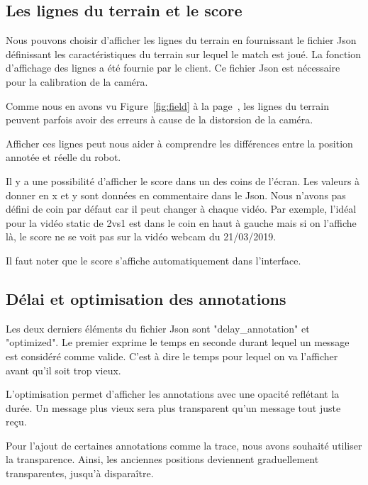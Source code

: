 \subsection{Les lignes du terrain et le score}

Nous pouvons choisir d'afficher les lignes du terrain en
fournissant le fichier Json définissant les caractéristiques du
terrain sur lequel le match est joué. La fonction d'affichage des
lignes a été fournie par le client.
Ce fichier Json est nécessaire pour la calibration de la caméra.
\bigskip

Comme nous en avons vu Figure~\ref{fig:field} à la
page~\pageref{fig:field}, les lignes du terrain peuvent parfois
avoir des erreurs à cause de la distorsion de la caméra.

Afficher ces lignes peut nous aider à comprendre les différences
entre la position annotée et réelle du robot.
\bigskip

Il y a une possibilité d'afficher le score dans un des coins de
l'écran. Les valeurs à donner en x et y sont données en
commentaire dans le Json. Nous n'avons pas défini de coin par
défaut car il peut changer à chaque vidéo. Par exemple, l'idéal
pour la vidéo static de 2vs1 est dans le coin en haut à gauche
mais si on l'affiche là, le score ne se voit pas sur la vidéo
webcam du 21/03/2019.
\bigskip

Il faut noter que le score s'affiche automatiquement dans
l'interface.

\subsection{Délai et optimisation des annotations}

Les deux derniers éléments du fichier Json sont
"delay\_annotation" et "optimized". Le premier exprime le temps
en seconde durant lequel un message est considéré comme valide.
C'est à dire le temps pour lequel on va l'afficher avant qu'il
soit trop vieux.

\bigskip

L'optimisation permet d'afficher les annotations avec une opacité
reflétant la durée. Un message plus vieux sera plus transparent
qu'un message tout juste reçu. 
\bigskip

\label{transparence}
Pour l'ajout de certaines annotations comme la trace, nous avons
souhaité utiliser la transparence.
Ainsi, les anciennes positions deviennent graduellement
transparentes, jusqu'à disparaître.


